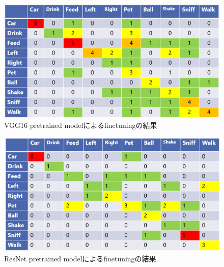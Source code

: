 \documentclass[twocolumn, a4paper]{UECIEresume}
\begin{document}
\begin{figure}[htbp]
   \begin{center}
    
    \includegraphics[scale=0.3]{./Img/vgg16_res.eps}
    \caption{VGG16 pretrained modelによるfinetuningの結果}
    \label{vgg16_res}
   \end{center}
\end{figure}
\begin{figure}[htbp]

   \begin{center}

    \includegraphics[scale=0.3]{./Img/resnet_res.eps}
  \caption{ResNet pretrained modelによるfinetuningの結果}
  \label{resnet_res}
   \end{center}

\end{figure}
\end{document}
